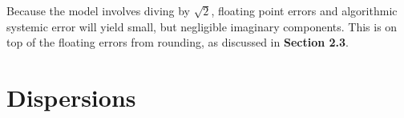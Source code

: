\begin{remark}
Because the model involves diving by $\sqrt{2}$, floating point errors and algorithmic systemic error will yield small, but negligible imaginary components.
This is on top of the floating errors from rounding, as discussed in \textbf{Section 2.3}.
\end{remark}

\newpage
\vspace{-2em}


\newpage
\vspace{-2em}


\newpage
\vspace{-2em}

\newpage
\section{Dispersions}

